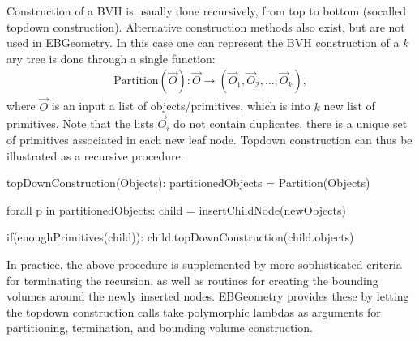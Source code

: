 \documentclass[letterpaper,10pt,english]{sphinxmanual}
\begin{document}
\sphinxAtStartPar
Construction of a BVH is usually done recursively, from top to bottom (so\sphinxhyphen{}called top\sphinxhyphen{}down construction).
Alternative construction methods also exist, but are not used in EBGeometry.
In this case one can represent the BVH construction of a \(k\) \sphinxhyphen{}ary tree is done through a single function:
\begin{equation}\label{equation:BVH:Partition}
\begin{split}\textrm{Partition}\left(\vec{O}\right): \vec{O} \rightarrow \left(\vec{O}_1, \vec{O}_2, \ldots, \vec{O}_k\right),\end{split}
\end{equation}
\sphinxAtStartPar
where \(\vec{O}\) is an input a list of objects/primitives, which is  into \(k\) new list of primitives.
Note that the lists \(\vec{O}_i\) do not contain duplicates, there is a unique set of primitives associated in each new leaf node.
Top\sphinxhyphen{}down construction can thus be illustrated as a recursive procedure:

\begin{sphinxVerbatim}[commandchars=\\\{\}]
topDownConstruction(Objects):
   partitionedObjects = Partition(Objects)

   forall p in partitionedObjects:
      child = insertChildNode(newObjects)

      if(enoughPrimitives(child)):
         child.topDownConstruction(child.objects)
\end{sphinxVerbatim}

\sphinxAtStartPar
In practice, the above procedure is supplemented by more sophisticated criteria for terminating the recursion, as well as routines for creating the bounding volumes around the newly inserted nodes.
EBGeometry provides these by letting the top\sphinxhyphen{}down construction calls take polymorphic lambdas as arguments for partitioning, termination, and bounding volume construction.
\end{document}
